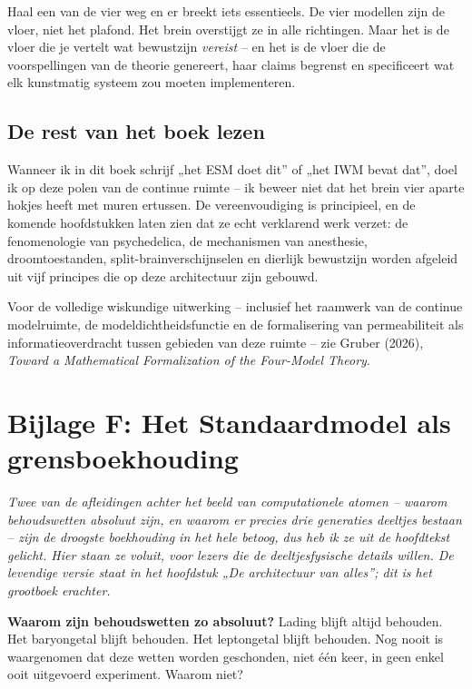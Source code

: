 \documentclass[11pt, twoside, openright]{book}
\begin{document}
Haal een van de vier weg en er breekt iets essentieels. De vier modellen zijn de vloer, niet het plafond. Het brein overstijgt ze in alle richtingen. Maar het is de vloer die je vertelt wat bewustzijn \textit{vereist} -- en het is de vloer die de voorspellingen van de theorie genereert, haar claims begrenst en specificeert wat elk kunstmatig systeem zou moeten implementeren.

\section*{De rest van het boek lezen}

Wanneer ik in dit boek schrijf „het ESM doet dit” of „het IWM bevat dat”, doel ik op deze polen van de continue ruimte -- ik beweer niet dat het brein vier aparte hokjes heeft met muren ertussen. De vereenvoudiging is principieel, en de komende hoofdstukken laten zien dat ze echt verklarend werk verzet: de fenomenologie van psychedelica, de mechanismen van anesthesie, droomtoestanden, split-brainverschijnselen en dierlijk bewustzijn worden afgeleid uit vijf principes die op deze architectuur zijn gebouwd.

Voor de volledige wiskundige uitwerking -- inclusief het raamwerk van de continue modelruimte, de modeldichtheidsfunctie en de formalisering van permeabiliteit als informatieoverdracht tussen gebieden van deze ruimte -- zie Gruber (2026), \textit{Toward a Mathematical Formalization of the Four-Model Theory}.


\chapter*{Bijlage F: Het Standaardmodel als grensboekhouding}

\textit{Twee van de afleidingen achter het beeld van computationele atomen -- waarom behoudswetten absoluut zijn, en waarom er precies drie generaties deeltjes bestaan -- zijn de droogste boekhouding in het hele betoog, dus heb ik ze uit de hoofdtekst gelicht. Hier staan ze voluit, voor lezers die de deeltjesfysische details willen. De levendige versie staat in het hoofdstuk „De architectuur van alles”; dit is het grootboek erachter.}

\textbf{Waarom zijn behoudswetten zo absoluut?} Lading blijft altijd behouden. Het baryongetal blijft behouden. Het leptongetal blijft behouden. Nog nooit is waargenomen dat deze wetten worden geschonden, niet één keer, in geen enkel ooit uitgevoerd experiment. Waarom niet?
\end{document}
